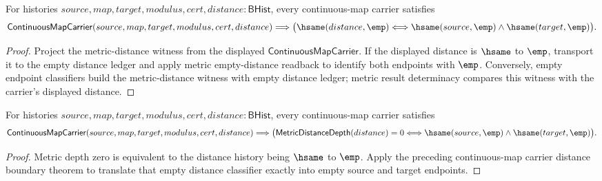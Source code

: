 \begin{theorem}
\label{thm:continuousmap-carrier-distance-empty-iff}
For histories $source,map,target,modulus,cert,distance:\mathsf{BHist}$, every
continuous-map carrier satisfies
$$
\mathsf{ContinuousMapCarrier}(source,map,target,modulus,cert,distance)
\Longrightarrow
\bigl(\hsame(distance,\emp)\Longleftrightarrow
\hsame(source,\emp)\land\hsame(target,\emp)\bigr).
$$
\end{theorem}
\begin{proof}
Project the metric-distance witness from the displayed
$\mathsf{ContinuousMapCarrier}$. If the displayed distance is $\hsame$ to
$\emp$, transport it to the empty distance ledger and apply metric
empty-distance readback to identify both endpoints with $\emp$. Conversely,
empty endpoint classifiers build the metric-distance witness with empty
distance ledger; metric result determinacy compares this witness with the
carrier's displayed distance.
\end{proof}

\begin{theorem}
\label{thm:continuousmap-carrier-distance-zero-iff-empty-endpoints}
For histories $source,map,target,modulus,cert,distance:\mathsf{BHist}$, every
continuous-map carrier satisfies
$$
\mathsf{ContinuousMapCarrier}(source,map,target,modulus,cert,distance)
\Longrightarrow
\bigl(\mathsf{MetricDistanceDepth}(distance)=0\Longleftrightarrow
\hsame(source,\emp)\land\hsame(target,\emp)\bigr).
$$
\end{theorem}
\begin{proof}
Metric depth zero is equivalent to the distance history being $\hsame$ to
$\emp$. Apply the preceding continuous-map carrier distance boundary theorem
to translate that empty distance classifier exactly into empty source and
target endpoints.
\end{proof}

